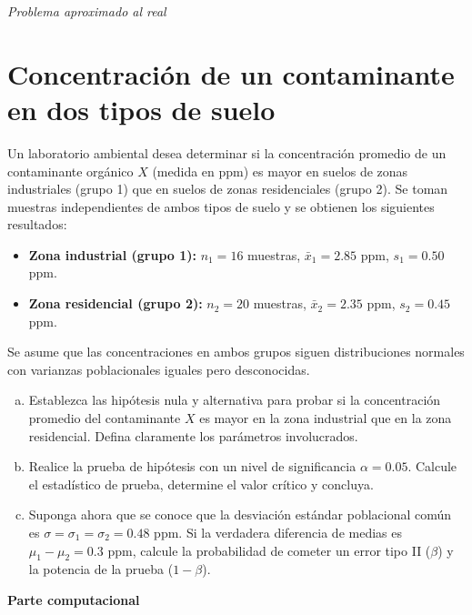 \documentclass[a4paper]{article}
\begin{document}
\textit{Problema aproximado al real}

\section{Concentración de un contaminante en dos tipos de suelo}

Un laboratorio ambiental desea determinar si la concentración promedio de un contaminante orgánico $X$ (medida en ppm) es mayor en suelos de zonas industriales (grupo 1) que en suelos de zonas residenciales (grupo 2). Se toman muestras independientes de ambos tipos de suelo y se obtienen los siguientes resultados:

\begin{itemize}
    \item \textbf{Zona industrial (grupo 1):} $n_1 = 16$ muestras, $\bar{x}_1 = 2.85$ ppm, $s_1 = 0.50$ ppm.
    \item \textbf{Zona residencial (grupo 2):} $n_2 = 20$ muestras, $\bar{x}_2 = 2.35$ ppm, $s_2 = 0.45$ ppm.
\end{itemize}

Se asume que las concentraciones en ambos grupos siguen distribuciones normales con varianzas poblacionales iguales pero desconocidas.

\begin{enumerate}[a)]
    \item Establezca las hipótesis nula y alternativa para probar si la concentración promedio del contaminante $X$ es mayor en la zona industrial que en la zona residencial. Defina claramente los parámetros involucrados.

    \item Realice la prueba de hipótesis con un nivel de significancia $\alpha = 0.05$. Calcule el estadístico de prueba, determine el valor crítico y concluya.

    \item Suponga ahora que se conoce que la desviación estándar poblacional común es $\sigma = \sigma_1 = \sigma_2 = 0.48$ ppm. Si la verdadera diferencia de medias es $\mu_1 - \mu_2 = 0.3$ ppm, calcule la probabilidad de cometer un error tipo II ($\beta$) y la potencia de la prueba ($1 - \beta$).
\end{enumerate}

\textbf{Parte computacional}
\end{document}
